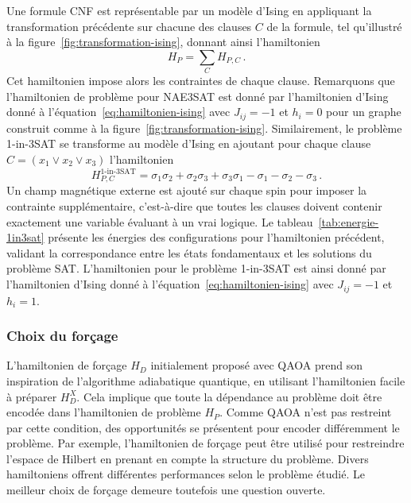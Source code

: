 Une formule CNF est représentable par un modèle d'Ising en appliquant la transformation précédente sur chacune des clauses $C$ de la formule, tel qu'illustré à la figure~\ref{fig:transformation-ising}, donnant ainsi l'hamiltonien 
\begin{equation}
    H_{P} = \sum_{C} H_{P, C} \,.
\end{equation}
Cet hamiltonien impose alors les contraintes de chaque clause. Remarquons que l'hamiltonien de problème pour NAE3SAT est donné par l'hamiltonien d'Ising donné à l'équation~\ref{eq:hamiltonien-ising} avec $J_{ij}=-1$ et $h_{i}=0$ pour un graphe construit comme à la figure~\ref{fig:transformation-ising}. Similairement, le problème 1-in-3SAT se transforme au modèle d'Ising en ajoutant pour chaque clause $C = (x_{1} \lor x_{2} \lor x_{3})$ l'hamiltonien
\begin{equation}
   H_{P, C}^{\text{1-in-3SAT}} = \sigma_{1}\sigma_{2} + \sigma_{2}\sigma_{3} + \sigma_{3}\sigma_{1} - \sigma_{1} - \sigma_{2} - \sigma_{3} \,.
\end{equation}
Un champ magnétique externe est ajouté sur chaque spin pour imposer la contrainte supplémentaire, c'est-à-dire que toutes les clauses doivent contenir exactement une variable évaluant à un vrai logique. Le tableau~\ref{tab:energie-1in3sat} présente les énergies des configurations pour l'hamiltonien précédent, validant la correspondance entre les états fondamentaux et les solutions du problème SAT. L'hamiltonien pour le problème 1-in-3SAT est ainsi donné par l'hamiltonien d'Ising donné à l'équation~\ref{eq:hamiltonien-ising} avec $J_{ij}=-1$ et $h_{i}=1$.


\subsubsection{Choix du forçage}

L'hamiltonien de forçage $H_{D}$ initialement proposé avec QAOA prend son inspiration de l'algorithme adiabatique quantique, en utilisant l'hamiltonien facile à préparer $H_{D}^{X}$. Cela implique que toute la dépendance au problème doit être encodée dans l'hamiltonien de problème $H_{P}$. Comme QAOA n'est pas restreint par cette condition, des opportunités se présentent pour encoder différemment le problème. Par exemple, l'hamiltonien de forçage peut être utilisé pour restreindre l'espace de Hilbert en prenant en compte la structure du problème. Divers hamiltoniens offrent différentes performances selon le problème étudié. Le meilleur choix de forçage demeure toutefois une question ouverte.

